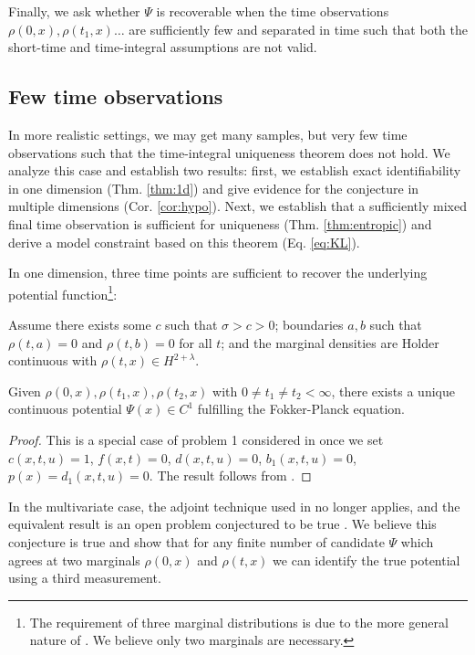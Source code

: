 \documentclass{article}
\begin{document}
Finally, we ask whether $\Psi$ is recoverable when the time observations $\rho(0,x), \rho(t_1,x) \hdots $ are sufficiently few and separated in time such that both the short-time and time-integral assumptions are not valid.
\subsection{Few time observations}\label{sec:finiteobs}

In more realistic settings, we may get many samples, but very few time observations such that the time-integral uniqueness theorem does not hold. We analyze this case and establish two results: first, we establish exact identifiability in one dimension (Thm. \ref{thm:1d}) and give evidence for the conjecture in multiple dimensions (Cor. \ref{cor:hypo}). Next, we establish that a sufficiently mixed final time observation is sufficient for uniqueness (Thm. \ref{thm:entropic}) and derive a model constraint based on this theorem (Eq. \ref{eq:KL}).

In one dimension, three time points are sufficient to recover the underlying potential function\footnote{The requirement of three marginal distributions is due to the more general nature of \citep[Problem 1]{gol2010uniqueness}. We believe only two marginals are necessary.}:
\begin{thm}[1-D identifiability]\label{thm:1d}
Assume there exists some $c$ such that $\sigma>c>0$; boundaries $a,b$ such that $\rho(t,a)=0$ and $\rho(t,b)=0$ for all $t$; and the marginal densities are Holder continuous with $\rho(t,x) \in H^{2+\lambda}$.

Given $\rho(0,x), \rho(t_1,x), \rho(t_2,x)$ with $0\neq t_1\neq t_2 < \infty$, there exists a unique continuous potential $\Psi(x) \in C^1$ fulfilling the Fokker-Planck equation.
\end{thm}
\begin{proof}
This is a special case of problem 1 considered in \citep{gol2010uniqueness} once we set $c(x,t,u)=1$, $f(x,t)=0$, $d(x,t,u)=0$, $b_1(x,t,u)=0$, $p(x)=d_1(x,t,u)=0$. The result follows from \citep[Theorem 1]{gol2010uniqueness}.
\end{proof}

In the multivariate case, the adjoint technique used in \citep{gol2010uniqueness} no longer applies, and the equivalent result is an open problem conjectured to be true \citep{de2012note}. We believe this conjecture is true and show that for any finite number of candidate $\Psi$ which agrees at two marginals $\rho(0,x)$ and $\rho(t,x)$ we can identify the true potential using a third measurement.
\end{document}
